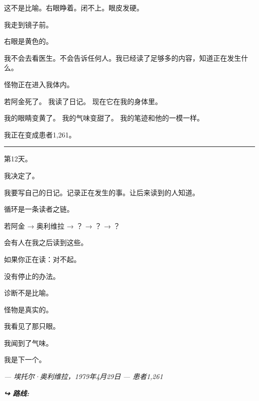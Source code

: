 \noindent 这不是比喻。右眼睁着。闭不上。眼皮发硬。

\noindent 我走到镜子前。

\noindent 右眼是黄色的。

\noindent 我不会去看医生。不会告诉任何人。我已经读了足够多的内容，知道正在发生什么。

\noindent 怪物正在进入我体内。

\noindent 若阿金死了。
我读了日记。
现在它在我的身体里。

\noindent 我的眼睛变黄了。
我的气味变甜了。
我的笔迹和他的一模一样。

\noindent 我正在变成患者1,261。

\vspace{0.5em}\noindent\rule{\textwidth}{0.5pt}\vspace{0.5em}

\noindent 第12天。

\noindent 我决定了。

\noindent 我要写自己的日记。记录正在发生的事。让后来读到的人知道。

\noindent 循环是一条读者之链。

\noindent 若阿金 → 奥利维拉 → ？ → ？ → ？

\noindent 会有人在我之后读到这些。

\noindent 如果你正在读：对不起。

\noindent 没有停止的办法。

\noindent 诊断不是比喻。

\noindent 怪物是真实的。

\noindent 我看见了那只眼。

\noindent 我闻到了气味。

\noindent 我是下一个。

\noindent \textit{--- 埃托尔·奥利维拉，1979年4月29日}
\textit{--- 患者1,261}

\vspace{0.5em}
\noindent\textit{\textbf{↪ 路线:}  \rotasep {}}
